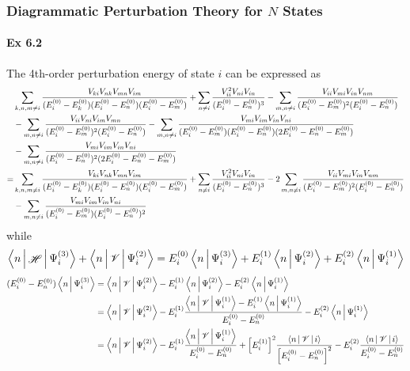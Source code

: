 \documentclass[a4paper]{article}
\DeclareMathOperator{\sH}{\mathscr{H}}
\newcommand{\ex}[1]{\paragraph{Ex #1}}
\numberwithin{equation}{subsection}
\begin{document}
\subsubsection{Diagrammatic Perturbation Theory for $ N $ States}
\ex{6.2}
The 4th-order perturbation energy of state $ i $ can be expressed as
\begin{align}
&\sum_{k,n,m\neq i} \dfrac{V_{ki}V_{nk}V_{mn}V_{im}}{(E_i^{(0)}-E_k^{(0)})(E_i^{(0)}-E_n^{(0)})(E_i^{(0)}-E_m^{(0)})} + \sum_{n\neq i} \dfrac{V_{ii}^2 V_{ni}V_{in}}{(E_i^{(0)}-E_n^{(0)})^3} - \sum_{m,n\neq i} \dfrac{V_{ii}V_{mi}V_{in}V_{nm}}{(E_i^{(0)}-E_m^{(0)})^2(E_i^{(0)}-E_n^{(0)})} \notag\\
&- \sum_{m,n\neq i} \dfrac{V_{ii}V_{ni}V_{im}V_{mn}}{(E_i^{(0)}-E_m^{(0)})^2(E_i^{(0)}-E_n^{(0)})} - \sum_{m,n\neq i} \dfrac{V_{mi}V_{im}V_{in}V_{ni}}{(E_i^{(0)}-E_m^{(0)})(E_i^{(0)}-E_n^{(0)})(2E_i^{(0)}-E_n^{(0)}-E_m^{(0)})} \notag\\
&- \sum_{m,n\neq i} \dfrac{V_{mi}V_{im}V_{in}V_{ni}}{(E_i^{(0)}-E_n^{(0)})^2(2E_i^{(0)}-E_n^{(0)}-E_m^{(0)})} \notag\\
= &\sum_{k,n,m\neq i} \dfrac{V_{ki}V_{nk}V_{mn}V_{im}}{(E_i^{(0)}-E_k^{(0)})(E_i^{(0)}-E_n^{(0)})(E_i^{(0)}-E_m^{(0)})} + \sum_{n\neq i} \dfrac{V_{ii}^2 V_{ni}V_{in}}{(E_i^{(0)}-E_n^{(0)})^3} - 2\sum_{m,n\neq i} \dfrac{V_{ii}V_{mi}V_{in}V_{nm}}{(E_i^{(0)}-E_m^{(0)})^2(E_i^{(0)}-E_n^{(0)})} \notag\\
&%
- \sum_{m,n\neq i} \dfrac{V_{mi}V_{im}V_{in}V_{ni}}{(E_i^{(0)}-E_m^{(0)})(E_i^{(0)}-E_n^{(0)})^2} 
\end{align}
while
\begin{equation}\label{key}
\Braket{n | \sH | \Psi_i^{(3)}} + \Braket{n | \mathscr{V} | \Psi_i^{(2)}} = E_i^{(0)} \Braket{n|\Psi_i^{(3)}} + E_i^{(1)} \Braket{n|\Psi_i^{(2)}} + E_i^{(2)} \Braket{n|\Psi_i^{(1)}}
\end{equation}
\begin{align}\label{key}
(E_i^{(0)} - E_n^{(0)})\Braket{n | \Psi_i^{(3)}} 
&= \Braket{n | \mathscr{V} | \Psi_i^{(2)}} - E_i^{(1)} \Braket{n|\Psi_i^{(2)}} - E_i^{(2)} \Braket{n|\Psi_i^{(1)}} \notag\\
&= \Braket{n | \mathscr{V} | \Psi_i^{(2)}} 
- E_i^{(1)} \dfrac{\Braket{n | \mathscr{V} | \Psi_i^{(1)}} - E_i^{(1)}\Braket{n|\Psi_i^{(1)}}}{E_i^{(0)} - E_n^{(0)}} 
- E_i^{(2)} \Braket{n|\Psi_i^{(1)}} \notag\\
&= \Braket{n | \mathscr{V} | \Psi_i^{(2)}} 
- E_i^{(1)} \dfrac{\Braket{n | \mathscr{V} | \Psi_i^{(1)}}}{E_i^{(0)} - E_n^{(0)}} 
+ \qty[E_i^{(1)}]^2 \dfrac{\Braket{n|\mathscr{V}|i}}{\qty[E_i^{(0)} - E_n^{(0)}]^2} 
- E_i^{(2)} \dfrac{\Braket{n|\mathscr{V}|i}}{E_i^{(0)} - E_n^{(0)}} 
\end{align}
\end{document}
